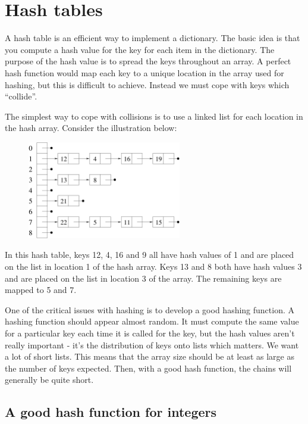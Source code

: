 \documentclass[11pt,b5paper]{book}
\begin{document}
\section{Hash tables}

A hash table is an efficient way to implement a dictionary.
The basic idea is that you compute a hash value for the key for each
item in the dictionary.
The purpose of the hash value is to spread the keys throughout an array.
A perfect hash function would map each key to a unique location in
the array used for hashing, but this is difficult to achieve.
Instead we must cope with keys which ``collide''.

The simplest way to cope with collisions is to use a linked list for
each location in the hash array.
Consider the illustration below:

\begin{figure}[h!]
\centering\includegraphics[width=0.6\textwidth]{hash_table.pdf}
\end{figure}

In this hash table, keys 12, 4, 16 and 9 all have hash values of 1 and
are placed on the list in location 1 of the hash array.
Keys 13 and 8 both have hash values 3 and are placed on the list in
location 3 of the array.
The remaining keys are mapped to 5 and 7.

One of the critical issues with hashing is to develop a good hashing
function.
A hashing function should appear almost random.
It must compute the same value for a particular key each time it is
called for the key, but the hash values aren't really important - it's the distribution of keys onto lists which matters.
We want a lot of short lists.
This means that the array size should be at least as large as the number
of keys expected.
Then, with a good hash function, the chains will generally be quite short.

\subsection{A good hash function for integers}
\end{document}
